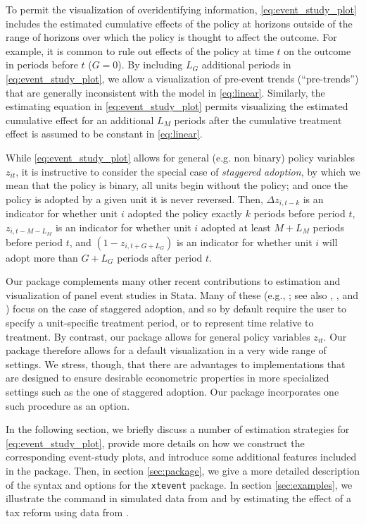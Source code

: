 \documentclass[bib]{./sty/statapress}
\begin{document}
To permit the visualization of overidentifying information, \eqref{eq:event_study_plot} includes the estimated cumulative effects of the policy at horizons outside of the range of horizons over which the policy is thought to affect the outcome.
For example, it is common to rule out effects of the policy at time $t$ on the outcome in periods before $t$ ($G=0$).
By including $L_G$ additional periods in \eqref{eq:event_study_plot}, we allow a visualization of pre-event trends (``pre-trends'') that are generally inconsistent with the model in \eqref{eq:linear}.
Similarly, the estimating equation in \eqref{eq:event_study_plot} permits visualizing the estimated cumulative effect for an additional $L_M$ periods after the cumulative treatment effect is assumed to be constant in \eqref{eq:linear}.

While \eqref{eq:event_study_plot} allows for general (e.g. non binary) policy variables $z_{it}$, it is instructive to consider the special case of \textit{staggered adoption}, by which we mean that the policy is binary, all units begin without the policy; and once the policy is adopted by a given unit it is never reversed.
Then, $\Delta z_{i,t-k}$ is an indicator for whether unit $i$ adopted the policy exactly $k$ periods before period $t$,  $z_{i,t-M-L_M}$ is an indicator for whether unit $i$ adopted at least $M+L_M$ periods before period $t$, and $(1-z_{i,t+G+L_G})$ is an indicator for whether unit $i$ will adopt more than $G+L_G$ periods after period $t$.

Our package complements many other recent contributions to estimation and visualization of panel event studies in Stata. Many of these (e.g., \citep{eventddsj}; see also \citep{didmultiplegt}, \citep{didimputation}, and \citep{eventstudyinteract}) focus on the case of staggered adoption, and so by default require the user to specify a unit-specific treatment period, or to represent time relative to treatment. By contrast, our package allows for general policy variables $z_{it}$. Our package therefore allows for a default visualization in a very wide range of settings. We stress, though, that there are advantages to implementations that are designed to ensure desirable econometric properties in more specialized settings such as the one of staggered adoption. Our package incorporates one such procedure as an option.

In the following section, we briefly discuss a number of estimation strategies for \eqref{eq:event_study_plot}, provide more details on how we construct the corresponding event-study plots, and introduce some additional features included in the \xtevent package.
Then, in section \ref{sec:package}, we give a more detailed description of the syntax and options for the \texttt{xtevent} package.
In section \ref{sec:examples}, we illustrate the command in simulated data from \citet{freyaldenhoven2021visualization} and by estimating the effect of a tax reform using data from \citet{martinez2022mobility}.
\end{document}
